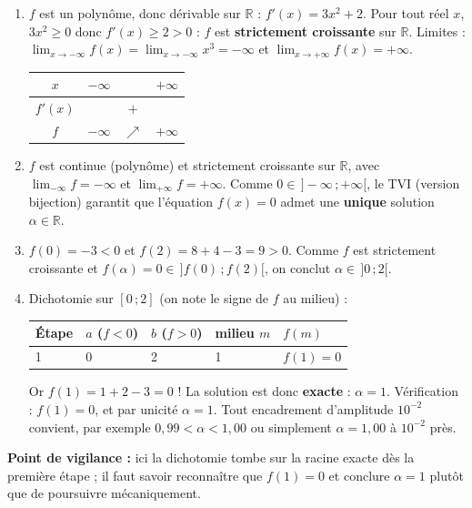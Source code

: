 \documentclass[11pt]{article}
\begin{document}
\begin{corrige}
\begin{enumerate}
\item $f$ est un polynôme, donc dérivable sur $\mathbb{R}$ : $f'(x)=3x^2+2$. Pour tout réel $x$, $3x^2\ge 0$ donc $f'(x)\ge 2>0$ : $f$ est \textbf{strictement croissante} sur $\mathbb{R}$.
Limites : $\lim_{x\to-\infty}f(x)=\lim_{x\to-\infty}x^3=-\infty$ et $\lim_{x\to+\infty}f(x)=+\infty$.
\begin{center}
\begin{tabular}{|c|ccc|}\hline
$x$ & $-\infty$ & & $+\infty$ \\ \hline
$f'(x)$ & & $+$ & \\ \hline
$f$ & $-\infty$ & $\nearrow$ & $+\infty$ \\ \hline
\end{tabular}
\end{center}

\item $f$ est continue (polynôme) et strictement croissante sur $\mathbb{R}$, avec $\lim_{-\infty}f=-\infty$ et $\lim_{+\infty}f=+\infty$. Comme $0\in\,]-\infty\,;+\infty[$, le TVI (version bijection) garantit que l'équation $f(x)=0$ admet une \textbf{unique} solution $\alpha\in\mathbb{R}$.

\item $f(0)=-3<0$ et $f(2)=8+4-3=9>0$. Comme $f$ est strictement croissante et $f(\alpha)=0\in\,]f(0)\,;f(2)[$, on conclut $\alpha\in\,]0\,;2[$.

\item Dichotomie sur $[0\,;2]$ (on note le signe de $f$ au milieu) :
\begin{center}
\begin{tabularx}{\linewidth}{|l|X|X|X|X|}\hline
\rowcolor{popblueL} Étape & $a$ ($f<0$) & $b$ ($f>0$) & milieu $m$ & $f(m)$ \\ \hline
1 & 0 & 2 & 1 & $f(1)=0$ \\ \hline
\end{tabularx}
\end{center}
Or $f(1)=1+2-3=0$ ! La solution est donc \textbf{exacte} : $\alpha=1$.
Vérification : $f(1)=0$, et par unicité $\alpha=1$. Tout encadrement d'amplitude $10^{-2}$ convient, par exemple $0,99<\alpha<1,00$ ou simplement $\alpha=1,00$ à $10^{-2}$ près.
\end{enumerate}
\textbf{Point de vigilance :} ici la dichotomie tombe sur la racine exacte dès la première étape ; il faut savoir reconnaître que $f(1)=0$ et conclure $\alpha=1$ plutôt que de poursuivre mécaniquement.
\end{corrige}
\end{document}
